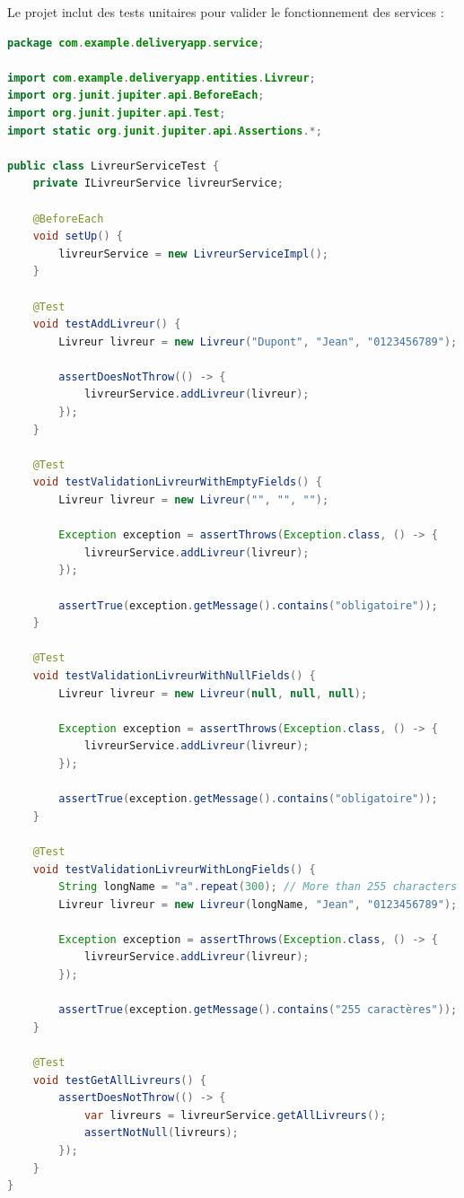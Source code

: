 \documentclass{rapportENSIAS}
\begin{document}
Le projet inclut des tests unitaires pour valider le fonctionnement des services :

\begin{lstlisting}[language=Java, caption=Tests unitaires pour LivreurService]
package com.example.deliveryapp.service;

import com.example.deliveryapp.entities.Livreur;
import org.junit.jupiter.api.BeforeEach;
import org.junit.jupiter.api.Test;
import static org.junit.jupiter.api.Assertions.*;

public class LivreurServiceTest {
    private ILivreurService livreurService;
    
    @BeforeEach
    void setUp() {
        livreurService = new LivreurServiceImpl();
    }
    
    @Test
    void testAddLivreur() {
        Livreur livreur = new Livreur("Dupont", "Jean", "0123456789");
        
        assertDoesNotThrow(() -> {
            livreurService.addLivreur(livreur);
        });
    }
    
    @Test
    void testValidationLivreurWithEmptyFields() {
        Livreur livreur = new Livreur("", "", "");
        
        Exception exception = assertThrows(Exception.class, () -> {
            livreurService.addLivreur(livreur);
        });
        
        assertTrue(exception.getMessage().contains("obligatoire"));
    }
    
    @Test
    void testValidationLivreurWithNullFields() {
        Livreur livreur = new Livreur(null, null, null);
        
        Exception exception = assertThrows(Exception.class, () -> {
            livreurService.addLivreur(livreur);
        });
        
        assertTrue(exception.getMessage().contains("obligatoire"));
    }
    
    @Test
    void testValidationLivreurWithLongFields() {
        String longName = "a".repeat(300); // More than 255 characters
        Livreur livreur = new Livreur(longName, "Jean", "0123456789");
        
        Exception exception = assertThrows(Exception.class, () -> {
            livreurService.addLivreur(livreur);
        });
        
        assertTrue(exception.getMessage().contains("255 caractères"));
    }
    
    @Test
    void testGetAllLivreurs() {
        assertDoesNotThrow(() -> {
            var livreurs = livreurService.getAllLivreurs();
            assertNotNull(livreurs);
        });
    }
}
\end{lstlisting}
\end{document}
